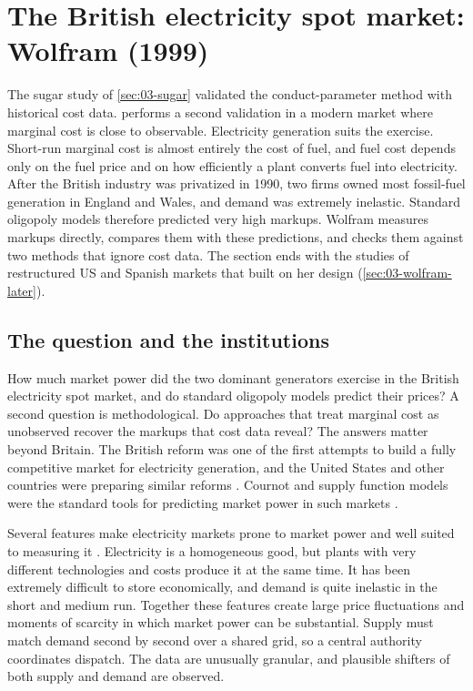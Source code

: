 \section{The British electricity spot market: Wolfram (1999)}\label{sec:03-electricity}

The sugar study of \cref{sec:03-sugar} validated the conduct-parameter method with historical cost data.
\citet{Wolfram1999} performs a second validation in a modern market where marginal cost is close to observable.
Electricity generation suits the exercise. Short-run marginal cost is almost entirely the cost of fuel, and fuel cost
depends only on the fuel price and on how efficiently a plant converts fuel into electricity. After the British
industry was privatized in 1990, two firms owned most fossil-fuel generation in England and Wales, and demand was
extremely inelastic. Standard oligopoly models therefore predicted very high markups. Wolfram measures markups
directly, compares them with these predictions, and checks them against two methods that ignore cost data. The
section ends with the studies of restructured US and Spanish markets that built on her design
(\cref{sec:03-wolfram-later}).

\subsection{The question and the institutions}\label{sec:03-wolfram-setting}

How much market power did the two dominant generators exercise in the British electricity spot market, and do
standard oligopoly models predict their prices? A second question is methodological. Do approaches that treat
marginal cost as unobserved recover the markups that cost data reveal? The answers matter beyond Britain. The British
reform was one of the first attempts to build a fully competitive market for electricity generation, and the United
States and other countries were preparing similar reforms \citep[p.~805]{Wolfram1999}. Cournot and supply function
models were the standard tools for predicting market power in such markets
\citep{GreenNewbery1992,BorensteinBushnell1999}.

Several features make electricity markets prone to market power and well suited to measuring it
\citep[pp.~687--688]{KelloggReguant2021}. Electricity is a homogeneous good, but plants with very different technologies
and costs produce it at the same time. It has been extremely difficult to store economically, and demand is quite
inelastic in the short and medium run. Together these features create large price fluctuations and moments of
scarcity in which market power can be substantial. Supply must match demand second by second over a shared grid, so a
central authority coordinates dispatch. The data are unusually granular, and plausible shifters of both supply and
demand are observed.

